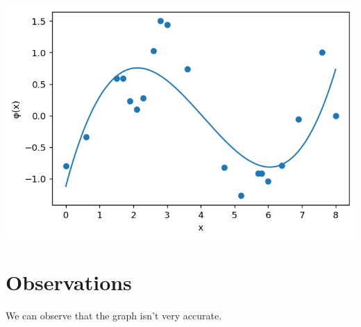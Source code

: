 \documentclass{article}
\begin{document}
\includegraphics[width=\textwidth,height=\textheight,keepaspectratio]{graph.png}

\section{Observations}
We can observe that the graph isn't very accurate.
\end{document}
